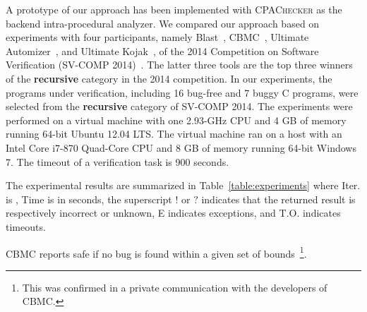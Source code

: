\newcommand{\safe}{S}
\newcommand{\unsafe}{U}
\newcommand{\unknown}{?}
\newcommand{\exception}{E}
\newcommand{\timeout}{T.O.}
\newcommand{\unknownmark}{\ensuremath{^?}}
\newcommand{\wrongmark}{\ensuremath{^!}}

A prototype of our approach has been implemented with
\textsc{CPAChecker} as the backend intra-procedural analyzer.
We compared our approach based on experiments with four participants,
namely Blast~\cite{BeyerHJM07}, CBMC~\cite{}, Ultimate
Automizer~\cite{HeizmannCDEHLNSP13}, and Ultimate Kojak~\cite{Kojak},
of the 2014 Competition on Software Verification (SV-COMP
2014)~\cite{svcomp14}.
The latter three tools are the top three winners of the
\textbf{recursive} category in the 2014 competition.
In our experiments, the programs under verification, including 16
bug-free and 7 buggy C programs, were selected from the
\textbf{recursive} category of SV-COMP 2014.
The experiments were performed on a virtual machine with one 2.93-GHz 
CPU and 4 GB of memory running 64-bit Ubuntu 12.04 LTS.
The virtual machine ran on a host with an Intel Core i7-870 Quad-Core
CPU and 8 GB of memory running 64-bit Windows 7.
The timeout of a verification task is 900 seconds.

The experimental results are summarized in
Table~\ref{table:experiments} where Iter. is , Time is in
seconds, the superscript $!$ or $?$ indicates that the returned result is
respectively incorrect or unknown, E indicates exceptions, and
T.O. indicates timeouts.

CBMC reports safe if no bug is found within a given set of
bounds~\footnote{This was confirmed in a private communication with
  the developers of CBMC.}.

